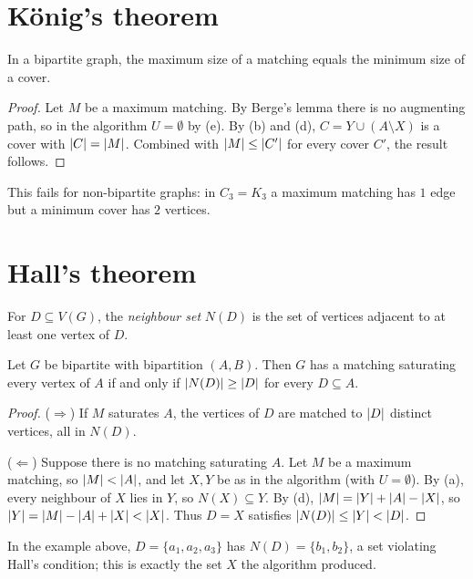 \section{K\"onig's theorem}

\begin{theorem}[K\"onig]
In a bipartite graph, the maximum size of a matching equals the minimum size of a cover.
\end{theorem}
\begin{proof}
Let $M$ be a maximum matching. By Berge's lemma there is no augmenting path, so in the algorithm
$U = \emptyset$ by (e). By (b) and (d), $C = Y \cup (A\setminus X)$ is a cover with
$\left\lvert C \right\rvert = \left\lvert M \right\rvert$. Combined with $\left\lvert M \right\rvert\le\left\lvert C' \right\rvert$ for every cover $C'$, the result follows.
\end{proof}

This fails for non-bipartite graphs: in $C_3 = K_3$ a maximum matching has $1$ edge but a minimum
cover has $2$ vertices.

\section{Hall's theorem}

For $D \subseteq V(G)$, the \emph{neighbour set} $N(D)$ is the set of vertices adjacent to at
least one vertex of $D$.

\begin{theorem}[Hall]
Let $G$ be bipartite with bipartition $(A,B)$. Then $G$ has a matching saturating every vertex of
$A$ if and only if $\left\lvert N(D) \right\rvert \ge \left\lvert D \right\rvert$ for every $D \subseteq A$.
\end{theorem}
\begin{proof}
($\Rightarrow$) If $M$ saturates $A$, the vertices of $D$ are matched to $\left\lvert D \right\rvert$ distinct vertices,
all in $N(D)$.

($\Leftarrow$) Suppose there is no matching saturating $A$. Let $M$ be a maximum matching, so
$\left\lvert M \right\rvert < \left\lvert A \right\rvert$, and let $X, Y$ be as in the algorithm (with $U = \emptyset$). By (a), every
neighbour of $X$ lies in $Y$, so $N(X) \subseteq Y$. By (d),
$\left\lvert M \right\rvert = \left\lvert Y \right\rvert + \left\lvert A \right\rvert - \left\lvert X \right\rvert$, so $\left\lvert Y \right\rvert = \left\lvert M \right\rvert - \left\lvert A \right\rvert + \left\lvert X \right\rvert < \left\lvert X \right\rvert$.
Thus $D = X$ satisfies $\left\lvert N(D) \right\rvert \le \left\lvert Y \right\rvert < \left\lvert D \right\rvert$.
\end{proof}

In the example above, $D = \{a_1,a_2,a_3\}$ has $N(D) = \{b_1,b_2\}$, a set violating Hall's
condition; this is exactly the set $X$ the algorithm produced.

